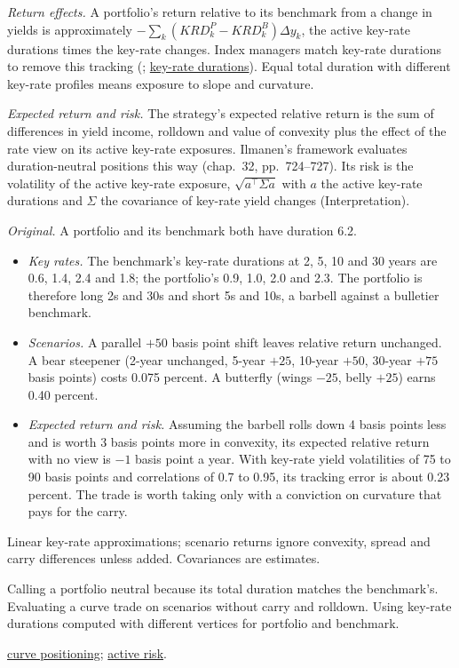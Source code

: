 \begin{qfmethod}\label{meth:curve-strategy-evaluation}
 \emph{Return effects.} A portfolio's return relative to its benchmark from a change in yields is approximately $-\sum_k(KRD^P_k-KRD^B_k)\Delta y_k$, the active key-rate durations times the key-rate changes. Index managers match key-rate durations to remove this tracking (\citep[chap.~43, pp.~1083--1084]{s7-fabozzifixed}; \hyperref[meth:yield-curve-factor-exposures]{key-rate durations}). Equal total duration with different key-rate profiles means exposure to slope and curvature.

\emph{Expected return and risk.} The strategy's expected relative return is the sum of differences in yield income, rolldown and value of convexity plus the effect of the rate view on its active key-rate exposures. Ilmanen's framework evaluates duration-neutral positions this way (chap.~32, pp.~724--727). Its risk is the volatility of the active key-rate exposure, $\sqrt{a^\top\Sigma a}$ with $a$ the active key-rate durations and $\Sigma$ the covariance of key-rate yield changes (Interpretation).

 \emph{Original.} A portfolio and its benchmark both have duration 6.2.
\begin{itemize}
\item \emph{Key rates.} The benchmark's key-rate durations at 2, 5, 10 and 30 years are 0.6, 1.4, 2.4 and 1.8; the portfolio's 0.9, 1.0, 2.0 and 2.3. The portfolio is therefore long 2s and 30s and short 5s and 10s, a barbell against a bulletier benchmark.
\item \emph{Scenarios.} A parallel $+50$ basis point shift leaves relative return unchanged. A bear steepener (2-year unchanged, 5-year $+25$, 10-year $+50$, 30-year $+75$ basis points) costs 0.075 percent. A butterfly (wings $-25$, belly $+25$) earns 0.40 percent.
\item \emph{Expected return and risk.} Assuming the barbell rolls down 4 basis points less and is worth 3 basis points more in convexity, its expected relative return with no view is $-1$ basis point a year. With key-rate yield volatilities of 75 to 90 basis points and correlations of 0.7 to 0.95, its tracking error is about 0.23 percent. The trade is worth taking only with a conviction on curvature that pays for the carry.
\end{itemize}

 Linear key-rate approximations; scenario returns ignore convexity, spread and carry differences unless added. Covariances are estimates.

 Calling a portfolio neutral because its total duration matches the benchmark's. Evaluating a curve trade on scenarios without carry and rolldown. Using key-rate durations computed with different vertices for portfolio and benchmark.

 \hyperref[meth:yield-curve-positioning]{curve positioning}; \hyperref[meth:active-risk-decomposition]{active risk}.

\end{qfmethod}

